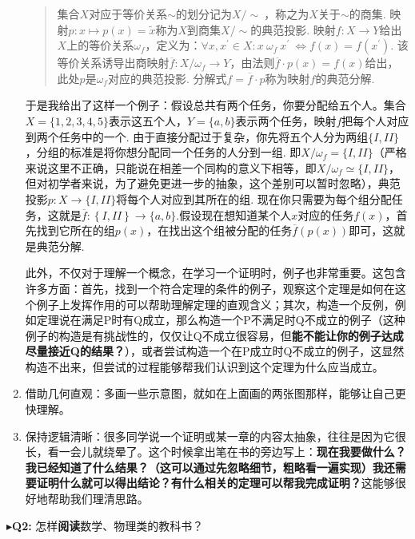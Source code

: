 \documentclass{ctexart}
\begin{document}
\begin{enumerate}[leftmargin=*, labelsep=0.5em]
\begin{quote}
集合$X$对应于等价关系$\sim$的划分记为$X/\sim\ $，称之为$X$关于$\sim$的商集.
映射$p:x \mapsto p(x) = \widetilde{x}$称为$X$到商集$X/\sim$的典范投影.
映射$f:X \rightarrow Y$给出$X$上的等价关系$\omega_{f}$，定义为：$\forall x,x^{'} \in X:x\ \omega_{f}\ x^{'}\  \Leftrightarrow f(x) = f\left( x^{'} \right)$.
该等价关系诱导出商映射$\overline{f}:X/\omega_{f} \rightarrow Y$，由法则$\overline{f} \cdot p(x) = f(x)$给出，此处$p$是$\omega_{f}$对应的典范投影.
分解式$f = \overline{f} \cdot p$称为映射$f$的典范分解.
\end{quote}

于是我给出了这样一个例子：假设总共有两个任务，你要分配给五个人。集合$X = \{ 1,2,3,4,5\}$表示这五个人，$Y = \{ a,b\}$表示两个任务，映射$f$把每个人对应到两个任务中的一个.
由于直接分配过于复杂，你先将五个人分为两组$\{ I,II\}$，分组的标准是将你想分配同一个任务的人分到一组.
即$X/\omega_{f} = \{ I,II\}$（严格来说这里不正确，只能说在相差一个同构的意义下相等，即$X/\omega_{f} \simeq \{ I,II\}$，但对初学者来说，为了避免更进一步的抽象，这个差别可以暂时忽略），典范投影$p:X \rightarrow \{ I,II\}$将每个人对应到其所在的组.
现在你只需要为每个组分配任务，这就是$\overline{f}:\left\{ I,II \right\} \rightarrow \{ a,b\}$.假设现在想知道某个人$x$对应的任务$f(x)$，首先找到它所在的组$p(x)$，在找出这个组被分配的任务$\overline{f}(p(x))$即可，这就是典范分解.

此外，不仅对于理解一个概念，在学习一个证明时，例子也非常重要。这包含许多方面：首先，找到一个符合定理的条件的例子，观察这个定理是如何在这个例子上发挥作用的可以帮助理解定理的直观含义；其次，构造一个反例，例如定理说在满足P时有Q成立，那么构造一个P不满足时Q不成立的例子（这种例子的构造是有挑战性的，仅仅让Q不成立很容易，但\textbf{能不能让你的例子达成尽量接近Q的结果？}），或者尝试构造一个在P成立时Q不成立的例子，这显然构造不出来，但尝试的过程能够帮我们认识到这个定理为什么应当成立。

\item 借助几何直观：多画一些示意图，就如在上面画的两张图那样，能够让自己更快理解。
\item 保持逻辑清晰：很多同学说一个证明或某一章的内容太抽象，往往是因为它很长，看一会儿就绕晕了。这个时候拿出笔在书的旁边写上：\textbf{现在我要做什么？我已经知道了什么结果？（这可以通过先忽略细节，粗略看一遍实现）我还需要证明什么就可以得出结论？有什么相关的定理可以帮我完成证明？}这能够很好地帮助我们理清思路。
\end{enumerate}

\noindent$\blacktriangleright$\;\textbf{Q2:} 怎样\textbf{阅读}数学、物理类的教科书？
\end{document}
